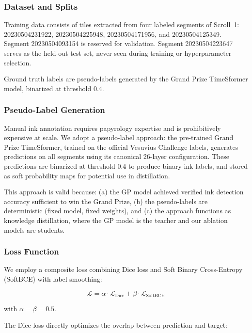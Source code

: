 \subsubsection{Dataset and Splits}

Training data consists of tiles extracted from four labeled segments of Scroll~1: 20230504231922, 20230504225948, 20230504171956, and 20230504125349. Segment 20230504093154 is reserved for validation. Segment 20230504223647 serves as the held-out test set, never seen during training or hyperparameter selection.

Ground truth labels are pseudo-labels generated by the Grand Prize TimeSformer model, binarized at threshold 0.4.

\subsubsection{Pseudo-Label Generation}
\label{sec:pseudo_labels}

Manual ink annotation requires papyrology expertise and is prohibitively expensive at scale. We adopt a pseudo-label approach: the pre-trained Grand Prize TimeSformer, trained on the official Vesuvius Challenge labels, generates predictions on all segments using its canonical 26-layer configuration. These predictions are binarized at threshold 0.4 to produce binary ink labels, and stored as soft probability maps for potential use in distillation.

This approach is valid because: (a) the GP model achieved verified ink detection accuracy sufficient to win the Grand Prize, (b) the pseudo-labels are deterministic (fixed model, fixed weights), and (c) the approach functions as knowledge distillation, where the GP model is the teacher and our ablation models are students.

\subsubsection{Loss Function}

We employ a composite loss combining Dice loss and Soft Binary Cross-Entropy (SoftBCE) with label smoothing:

\begin{equation}
\label{eq:loss}
\mathcal{L} = \alpha \cdot \mathcal{L}_{\text{Dice}} + \beta \cdot \mathcal{L}_{\text{SoftBCE}}
\end{equation}

\noindent with $\alpha = \beta = 0.5$.

The Dice loss directly optimizes the overlap between prediction and target:

